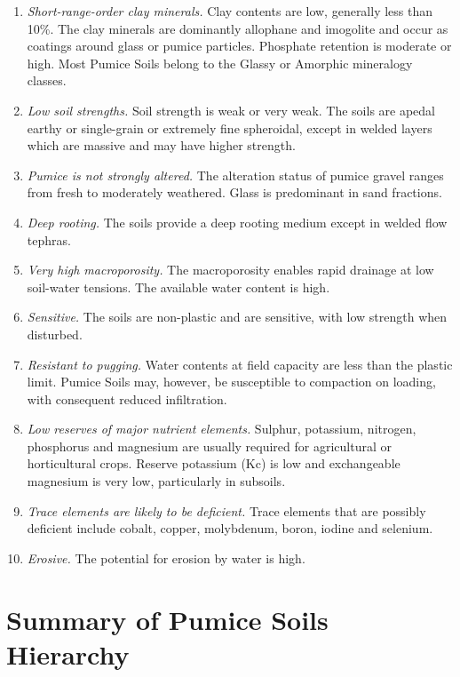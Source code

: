 \documentclass[
  letterpaper,
  DIV=11,
  numbers=noendperiod]{scrreprt}
\providecommand{\tightlist}{%
  \setlength{\itemsep}{0pt}\setlength{\parskip}{0pt}}\usepackage{longtable,booktabs,array}
\begin{document}
\begin{enumerate}
\def\labelenumi{\arabic{enumi}.}
\tightlist
\item
  \emph{Short-range-order clay minerals.} Clay contents are low,
  generally less than 10\%. The clay minerals are dominantly allophane
  and imogolite and occur as coatings around glass or pumice particles.
  Phosphate retention is moderate or high. Most Pumice Soils belong to
  the Glassy or Amorphic mineralogy classes.
\item
  \emph{Low soil strengths.} Soil strength is weak or very weak. The
  soils are apedal earthy or single-grain or extremely fine spheroidal,
  except in welded layers which are massive and may have higher
  strength.
\item
  \emph{Pumice is not strongly altered.} The alteration status of pumice
  gravel ranges from fresh to moderately weathered. Glass is predominant
  in sand fractions.
\item
  \emph{Deep rooting.} The soils provide a deep rooting medium except in
  welded flow tephras.
\item
  \emph{Very high macroporosity.} The macroporosity enables rapid
  drainage at low soil-water tensions. The available water content is
  high.
\item
  \emph{Sensitive.} The soils are non-plastic and are sensitive, with
  low strength when disturbed.
\item
  \emph{Resistant to pugging.} Water contents at field capacity are less
  than the plastic limit. Pumice Soils may, however, be susceptible to
  compaction on loading, with consequent reduced infiltration.
\item
  \emph{Low reserves of major nutrient elements.} Sulphur, potassium,
  nitrogen, phosphorus and magnesium are usually required for
  agricultural or horticultural crops. Reserve potassium (Kc) is low and
  exchangeable magnesium is very low, particularly in subsoils.
\item
  \emph{Trace elements are likely to be deficient.} Trace elements that
  are possibly deficient include cobalt, copper, molybdenum, boron,
  iodine and selenium.
\item
  \emph{Erosive.} The potential for erosion by water is high.
\end{enumerate}

\hypertarget{sec-sum-M}{%
\section{Summary of Pumice Soils Hierarchy}\label{sec-sum-M}}
\end{document}
